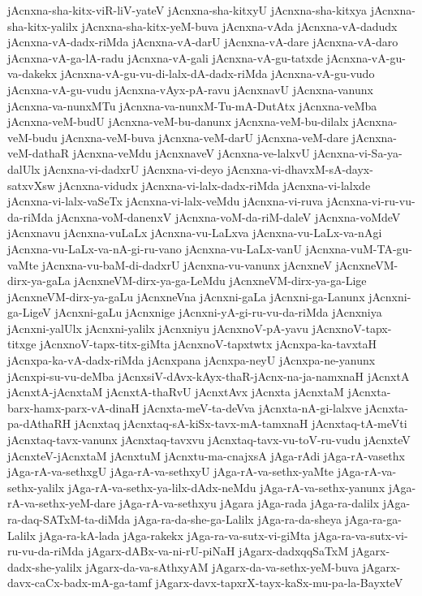 {jAcnxna-sha-kitx-viR-liV-yateV
jAcnxna-sha-kitxyU
jAcnxna-sha-kitxya
jAcnxna-sha-kitx-yalilx
jAcnxna-sha-kitx-yeM-buva
jAcnxna-vAda
jAcnxna-vA-dadudx
jAcnxna-vA-dadx-riMda
jAcnxna-vA-darU
jAcnxna-vA-dare
jAcnxna-vA-daro
jAcnxna-vA-ga-lA-radu
jAcnxna-vA-gali
jAcnxna-vA-gu-tatxde
jAcnxna-vA-gu-va-dakekx
jAcnxna-vA-gu-vu-di-lalx-dA-dadx-riMda
jAcnxna-vA-gu-vudo
jAcnxna-vA-gu-vudu
jAcnxna-vAyx-pA-ravu
jAcnxnavU
jAcnxna-vanunx
jAcnxna-va-nunxMTu
jAcnxna-va-nunxM-Tu-mA-DutAtx
jAcnxna-veMba
jAcnxna-veM-budU
jAcnxna-veM-bu-danunx
jAcnxna-veM-bu-dilalx
jAcnxna-veM-budu
jAcnxna-veM-buva
jAcnxna-veM-darU
jAcnxna-veM-dare
jAcnxna-veM-dathaR
jAcnxna-veMdu
jAcnxnaveV
jAcnxna-ve-lalxvU
jAcnxna-vi-Sa-ya-dalUlx
jAcnxna-vi-dadxrU
jAcnxna-vi-deyo
jAcnxna-vi-dhavxM-sA-dayx-satxvXsw
jAcnxna-vidudx
jAcnxna-vi-lalx-dadx-riMda
jAcnxna-vi-lalxde
jAcnxna-vi-lalx-vaSeTx
jAcnxna-vi-lalx-veMdu
jAcnxna-vi-ruva
jAcnxna-vi-ru-vu-da-riMda
jAcnxna-voM-danenxV
jAcnxna-voM-da-riM-daleV
jAcnxna-voMdeV
jAcnxnavu
jAcnxna-vuLaLx
jAcnxna-vu-LaLxva
jAcnxna-vu-LaLx-va-nAgi
jAcnxna-vu-LaLx-va-nA-gi-ru-vano
jAcnxna-vu-LaLx-vanU
jAcnxna-vuM-TA-gu-vaMte
jAcnxna-vu-baM-di-dadxrU
jAcnxna-vu-vanunx
jAcnxneV
jAcnxneVM-dirx-ya-gaLa
jAcnxneVM-dirx-ya-ga-LeMdu
jAcnxneVM-dirx-ya-ga-Lige
jAcnxneVM-dirx-ya-gaLu
jAcnxneVna
jAcnxni-gaLa
jAcnxni-ga-Lanunx
jAcnxni-ga-LigeV
jAcnxni-gaLu
jAcnxnige
jAcnxni-yA-gi-ru-vu-da-riMda
jAcnxniya
jAcnxni-yalUlx
jAcnxni-yalilx
jAcnxniyu
jAcnxnoV-pA-yavu
jAcnxnoV-tapx-titxge
jAcnxnoV-tapx-titx-giMta
jAcnxnoV-tapxtwtx
jAcnxpa-ka-tavxtaH
jAcnxpa-ka-vA-dadx-riMda
jAcnxpana
jAcnxpa-neyU
jAcnxpa-ne-yanunx
jAcnxpi-su-vu-deMba
jAcnxsiV-dAvx-kAyx-thaR-jAcnx-na-ja-namxnaH
jAcnxtA
jAcnxtA-jAcnxtaM
jAcnxtA-thaRvU
jAcnxtAvx
jAcnxta
jAcnxtaM
jAcnxta-barx-hamx-parx-vA-dinaH
jAcnxta-meV-ta-deVva
jAcnxta-nA-gi-lalxve
jAcnxta-pa-dAthaRH
jAcnxtaq
jAcnxtaq-sA-kiSx-tavx-mA-tamxnaH
jAcnxtaq-tA-meVti
jAcnxtaq-tavx-vanunx
jAcnxtaq-tavxvu
jAcnxtaq-tavx-vu-toV-ru-vudu
jAcnxteV
jAcnxteV-jAcnxtaM
jAcnxtuM
jAcnxtu-ma-cnajxsA
jAga-rAdi
jAga-rA-vasethx
jAga-rA-va-sethxgU
jAga-rA-va-sethxyU
jAga-rA-va-sethx-yaMte
jAga-rA-va-sethx-yalilx
jAga-rA-va-sethx-ya-lilx-dAdx-neMdu
jAga-rA-va-sethx-yanunx
jAga-rA-va-sethx-yeM-dare
jAga-rA-va-sethxyu
jAgara
jAga-rada
jAga-ra-dalilx
jAga-ra-daq-SATxM-ta-diMda
jAga-ra-da-she-ga-Lalilx
jAga-ra-da-sheya
jAga-ra-ga-Lalilx
jAga-ra-kA-lada
jAga-rakekx
jAga-ra-va-sutx-vi-giMta
jAga-ra-va-sutx-vi-ru-vu-da-riMda
jAgarx-dABx-va-ni-rU-piNaH
jAgarx-dadxqqSaTxM
jAgarx-dadx-she-yalilx
jAgarx-da-va-sAthxyAM
jAgarx-da-va-sethx-yeM-buva
jAgarx-davx-caCx-badx-mA-ga-tamf
jAgarx-davx-tapxrX-tayx-kaSx-mu-pa-la-BayxteV
}
